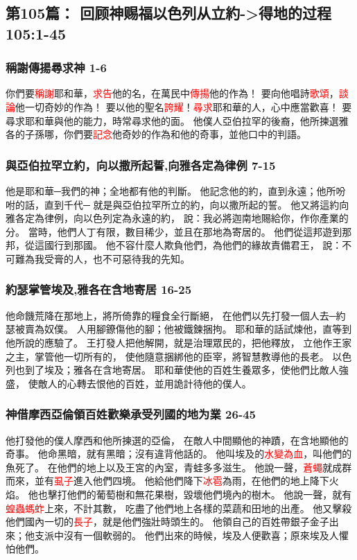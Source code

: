 \subsection{第105篇： 回顾神赐福以色列从立約->得地的过程 105:1-45}
\subsubsection{稱謝傳揚尋求神 1-6}
你們要\textcolor{red}{稱謝}耶和華，\textcolor{red}{求告}他的名，在萬民中\textcolor{red}{傳揚}他的作為！
要向他唱詩\textcolor{red}{歌頌}，\textcolor{red}{談論}他一切奇妙的作為！
要以他的聖名\textcolor{red}{誇耀}！\textcolor{red}{尋求}耶和華的人，心中應當歡喜！
要尋求耶和華與他的能力，時常尋求他的面。
他僕人亞伯拉罕的後裔，他所揀選雅各的子孫哪，你們要\textcolor{red}{記念}他奇妙的作為和他的奇事，並他口中的判語。

\subsubsection{與亞伯拉罕立約，向以撒所起誓,向雅各定為律例 7-15}
他是耶和華─我們的神；全地都有他的判斷。
他記念他的約，直到永遠；他所吩咐的話，直到千代─
就是與亞伯拉罕所立的約，向以撒所起的誓。
他又將這約向雅各定為律例，向以色列定為永遠的約，
說：我必將迦南地賜給你，作你產業的分。
當時，他們人丁有限，數目稀少，並且在那地為寄居的。
他們從這邦遊到那邦，從這國行到那國。
他不容什麼人欺負他們，為他們的緣故責備君王，
說：不可難為我受膏的人，也不可惡待我的先知。

\subsubsection{約瑟掌管埃及,雅各在含地寄居 16-25}
他命饑荒降在那地上，將所倚靠的糧食全行斷絕，
在他們以先打發一個人去─約瑟被賣為奴僕。
人用腳鐐傷他的腳；他被鐵鍊捆拘。
耶和華的話試煉他，直等到他所說的應驗了。
王打發人把他解開，就是治理眾民的，把他釋放，
立他作王家之主，掌管他一切所有的，
使他隨意捆綁他的臣宰，將智慧教導他的長老。
以色列也到了埃及；雅各在含地寄居。
耶和華使他的百姓生養眾多，使他們比敵人強盛，
使敵人的心轉去恨他的百姓，並用詭計待他的僕人。

\subsubsection{神借摩西亞倫領百姓歡樂承受列國的地为業 26-45}
他打發他的僕人摩西和他所揀選的亞倫，
在敵人中間顯他的神蹟，在含地顯他的奇事。
他命黑暗，就有黑暗；沒有違背他話的。
他叫埃及的\textcolor{red}{水變為血}，叫他們的魚死了。
在他們的地上以及王宮的內室，青蛙多多滋生。
他說一聲，\textcolor{red}{蒼蠅}就成群而來，並有\textcolor{red}{虱子}進入他們四境。
他給他們降下\textcolor{red}{冰雹}為雨，在他們的地上降下火焰。
他也擊打他們的葡萄樹和無花果樹，毀壞他們境內的樹木。
他說一聲，就有\textcolor{red}{蝗蟲螞蚱}上來，不計其數，
吃盡了他們地上各樣的菜蔬和田地的出產。
他又擊殺他們國內一切的\textcolor{red}{長子}，就是他們強壯時頭生的。
他領自己的百姓帶銀子金子出來；他支派中沒有一個軟弱的。
他們出來的時候，埃及人便歡喜；原來埃及人懼怕他們。

